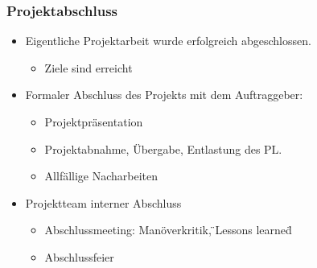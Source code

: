 \subsubsection{Projektabschluss}
\begin{itemize}
	\item Eigentliche Projektarbeit wurde erfolgreich abgeschlossen.
	\begin{itemize}
		\item Ziele sind erreicht
	\end{itemize}
	\item Formaler Abschluss des Projekts mit dem Auftraggeber:
	\begin{itemize}
		\item Projektpräsentation
		\item Projektabnahme, Übergabe, Entlastung des PL.
		\item Allfällige Nacharbeiten
	\end{itemize}
	\item Projektteam interner Abschluss
	\begin{itemize}
		\item Abschlussmeeting: Manöverkritik, \"{}Lessons learned\"{}
		\item Abschlussfeier
	\end{itemize}
\end{itemize}
\clearpage
